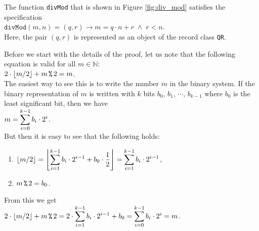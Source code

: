 \exampleEng
The function \texttt{divMod} that is shown in Figure \ref{fig:div_mod} satisfies the specification
\\[0.2cm]
\hspace*{1.3cm}
$\mathtt{divMod}(m, n) = (q, r)  \rightarrow m = q \cdot n + r \;\wedge\; r < n$.
\\[0.2cm]
Here, the pair $(q, r)$ is represented as an object of the record class \texttt{QR}. \eox



\proof
Before we start with the details of the proof, let us note that the following equation is valid for all $m\in\mathbb{N}$:
\\[0.2cm]
\hspace*{1.3cm}
$2 \cdot \lfloor m / 2 \rfloor + m \,\texttt{\%}\, 2 = m$.
\\[0.2cm]
The easiest way to see this is to write the number $m$ in the binary system.  If the binary representation of
$m$ is written with $k$ bits $b_0$, $b_1$, $\cdots$, $b_{k-1}$ where $b_0$ is the least significant bit, then we have
\\[0.2cm]
\hspace*{1.3cm}
$\displaystyle m = \sum\limits_{i=0}^{k-1} b_i \cdot 2^i$.
\\[0.2cm] 
But then it is easy to see that the following holds:
\begin{enumerate}
\item $\displaystyle \lfloor m / 2 \rfloor =
         \left\lfloor\sum\limits_{i=1}^{k-1} b_i \cdot 2^{i-1} + b_0 \cdot\frac{1}{2}\right\rfloor = 
         \sum\limits_{i=1}^{k-1} b_i \cdot 2^{i-1} $,
\item $m \,\texttt{\%}\, 2 = b_0$.
\end{enumerate}
From this we get
\\[0.2cm]
\hspace*{1.3cm}
$\displaystyle 2 \cdot \lfloor m / 2 \rfloor + m \,\texttt{\%}\, 2 = 2 \cdot \sum\limits_{i=1}^{k-1} b_i \cdot 2^{i-1} + b_0 =
\sum\limits_{i=0}^{k-1} b_i \cdot 2^i = m$.
\\[0.2cm]\mbox{}

